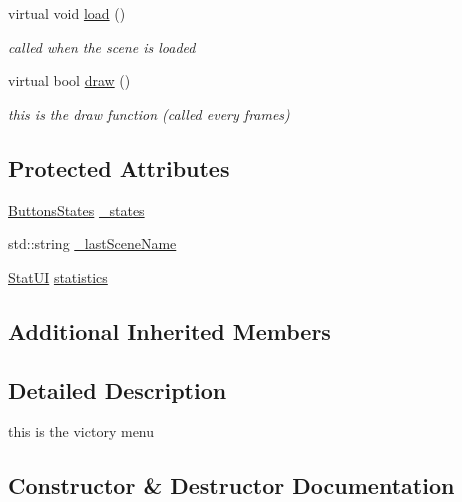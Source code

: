 \begin{DoxyCompactItemize}
\mbox{\label{class_scene_victory_a8ea4cc53a99f84a5175c97da37967235}} 
virtual void \hyperlink{class_scene_victory_a8ea4cc53a99f84a5175c97da37967235}{load} ()
\begin{DoxyCompactList}\small\item\em called when the scene is loaded \end{DoxyCompactList}\item 
virtual bool \hyperlink{class_scene_victory_ac79e3eadfb4bfafa8733888a1e86f57e}{draw} ()
\begin{DoxyCompactList}\small\item\em this is the draw function (called every frames) \end{DoxyCompactList}\end{DoxyCompactItemize}
\subsection*{Protected Attributes}
\begin{DoxyCompactItemize}
\item 
\hyperlink{struct_scene_victory_1_1_buttons_states}{Buttons\+States} \hyperlink{class_scene_victory_ae5a9926553871dad10cbc0d402e59357}{\+\_\+states}
\item 
std\+::string \hyperlink{class_scene_victory_a72a7535197c55d7e16d70d0beb8641e2}{\+\_\+last\+Scene\+Name}
\item 
\hyperlink{struct_scene_victory_1_1_stat_u_i}{Stat\+UI} \hyperlink{class_scene_victory_acdbd9784850934363227fc65c87a29c6}{statistics}
\end{DoxyCompactItemize}
\subsection*{Additional Inherited Members}


\subsection{Detailed Description}
this is the victory menu 

\subsection{Constructor \& Destructor Documentation}
\mbox{\label{class_scene_victory_a1317990e7bf48ca588959c5fac2e8f57}} 
